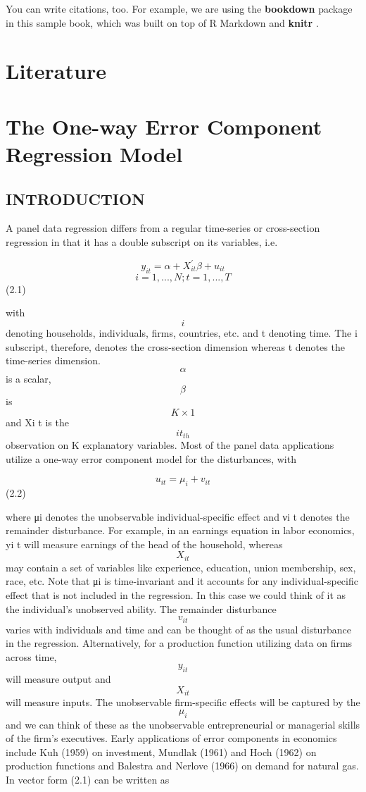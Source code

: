 \documentclass[
]{book}
\begin{document}
You can write citations, too. For example, we are using the \textbf{bookdown} package \citep{R-bookdown} in this sample book, which was built on top of R Markdown and \textbf{knitr} \citep{xie2015}.

\hypertarget{literature}{%
\chapter{Literature}\label{literature}}

\hypertarget{the-one-way-error-component-regression-model}{%
\chapter{The One-way Error Component Regression Model}\label{the-one-way-error-component-regression-model}}

\hypertarget{introduction}{%
\section{INTRODUCTION}\label{introduction}}

A panel data regression differs from a regular time-series or cross-section regression in that it
has a double subscript on its variables, i.e.

\[  y_{it}= \alpha + X_{it}^{'} \beta + u_{it}                      \]
\[ i=1, ... , N  ; t=1, ... ,T  \]
(2.1)

with \[ i \] denoting households, individuals, firms, countries, etc. and t denoting time. The i subscript, therefore, denotes the cross-section dimension whereas t denotes the time-series dimension. \[ \alpha  \] is a scalar, \[ \beta \] is \[ K × 1 \] and Xi t is the \[ it_{th} \] observation on K explanatory variables.
Most of the panel data applications utilize a one-way error component model for the disturbances, with

\[ u_{it}= \mu_i +  v_{it}      \]
(2.2)

where μi denotes the unobservable individual-specific effect and νi t denotes the remainder disturbance. For example, in an earnings equation in labor economics, yi t will measure earnings of the head of the household, whereas \[ X_{it} \] may contain a set of variables like experience, education, union membership, sex, race, etc. Note that μi is time-invariant and it accounts for any individual-specific effect that is not included in the regression. In this case we could think of it as the individual's unobserved ability. The remainder disturbance \[ v_{it} \] varies with individuals and time and can be thought of as the usual disturbance in the regression. Alternatively, for a production function utilizing data on firms across time, \[ y_{it} \] will measure output and \[ X_{it} \] will measure inputs. The unobservable firm-specific effects will be captured by the \[ \mu_i \]
and we can think of these as the unobservable entrepreneurial or managerial skills of the firm's executives. Early applications of error components in economics include Kuh (1959) on investment, Mundlak (1961) and Hoch (1962) on production functions and Balestra and Nerlove (1966) on demand for natural gas. In vector form (2.1) can be written as
\end{document}
